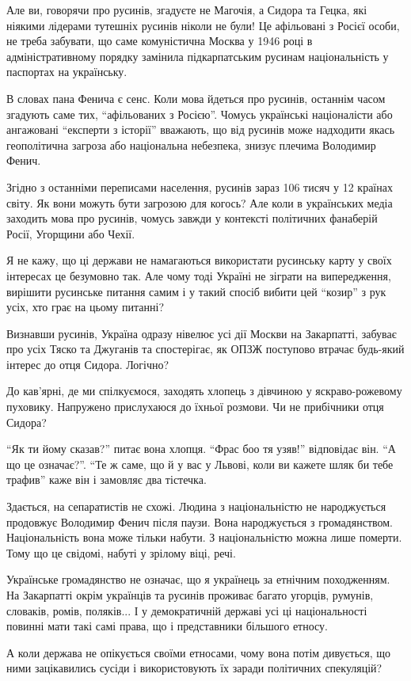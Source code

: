 Але ви, говорячи про русинів, згадуєте не Магочія, а Сидора та Гецка, які
ніякими лідерами тутешніх русинів ніколи не були! Це афільовані з Росієї особи,
не треба забувати, що саме комуністична Москва у 1946 році в адміністративному
порядку замінила підкарпатським русинам національність у паспортах на
українську.

В словах пана Фенича є сенс. Коли мова йдеться про русинів, останнім часом
згадують саме тих, \enquote{афільованих з Росією}. \dshM Чомусь українські націоналісти або ангажовані \enquote{експерти з історії} вважають,
що від русинів може надходити якась геополітична загроза або національна
небезпека, \dshM знизує плечима Володимир Фенич.

Згідно з останніми переписами населення, русинів зараз 106 тисяч у 12 країнах
світу. Як вони можуть бути загрозою для когось? Але коли в українських медіа
заходить мова про русинів, чомусь завжди у контексті політичних фанаберій
Росії, Угорщини або Чехії.

Я не кажу, що ці держави не намагаються використати русинську карту у своїх
інтересах \dshM це безумовно так. Але чому тоді Україні не зіграти на випередження,
вирішити русинське питання самим і у такий спосіб вибити цей \enquote{козир} з рук
усіх, хто грає на цьому питанні?

Визнавши русинів, Україна одразу нівелює усі дії Москви на Закарпатті, забуває
про усіх Тяско та Джуганів та спостерігає, як ОПЗЖ поступово втрачає будь-який
інтерес до отця Сидора. Логічно?

До кав’ярні, де ми спілкуємося, заходять хлопець з дівчиною у яскраво-рожевому
пуховику. Напружено прислухаюся до їхньої розмови. Чи не прибічники отця
Сидора?

\enquote{Як ти йому сказав?} \dshM питає вона хлопця. \enquote{Фрас боо тя узяв!} \dshM відповідає він.
\enquote{А що це означає?}. \enquote{Те ж саме, що й у вас у Львові, коли ви кажете шляк би
тебе трафив} \dshM каже він і замовляє два тістечка.

Здається, на сепаратистів не схожі. \dshM Людина з національністю не
народжується \dshM продовжує Володимир Фенич після паузи. \dshM Вона
народжується з громадянством. Національність вона може тільки набути. З
національністю можна лише померти. Тому що це \dshM свідомі, набуті у зрілому
віці, речі.

Українське громадянство не означає, що я українець за етнічним походженням. На
Закарпатті окрім українців та русинів проживає багато угорців, румунів,
словаків, ромів, поляків... І у демократичній державі усі ці національності
повинні мати такі самі права, що і представники більшого етносу.

А коли держава не опікується своїми етносами, чому вона потім дивується, що
ними зацікавились сусіди і використовують їх заради політичних спекуляцій?

